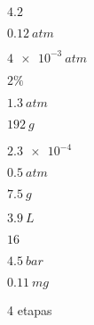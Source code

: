 \begin{answers}
\item 
\begin{answers}
[start = 1]\item \(\num{4,2}\)

\item \(\qty{0,12}{\unit{atm}}\)

\end{answers}

\item 
\begin{answers}
[start = 1]\item \(\qty{4e-3}{\unit{atm}}\)

\item \(2\%\)

\end{answers}

\item 
\begin{answers}
[start = 1]\item \(\qty{1,3}{\unit{atm}}\)

\item \(\qty{192}{\unit{g}}\)

\end{answers}

\item \(\num{2,3e-4}\)

\item 
\begin{answers}
[start = 1]\item \(\qty{0,5}{\unit{atm}}\)

\item \(\qty{7,5}{\unit{g}}\)

\item \(\qty{3,9}{\unit{L}}\)

\end{answers}

\item 
\begin{answers}
[start = 1]\item \(\num{16}\)

\item \(\qty{4,5}{\unit{bar}}\)

\end{answers}

\item 
\begin{answers}
[start = 1]\item \(\qty{0,11}{\unit{mg}}\)

\item 4 etapas


\end{answers}
\end{answers}
